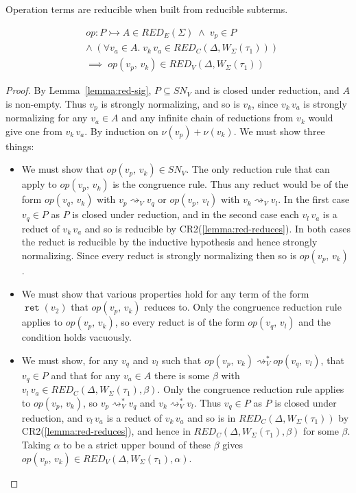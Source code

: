 \documentclass[acmsmall, screen, review, anonymous]{acmart}
\theoremstyle{definition}
\newcommand{\ind}[1]{W_{#1}}
\newcommand{\indintro}[3]{{#1}(#2,\, #3)}
\newcommand{\retname}{\mathtt{ret}}
\newcommand{\ret}[1]{\mathop{\retname}(#1)}
\newcommand{\types}{\mathrel{:}}
\newcommand{\app}[2]{#1\,#2}
\newcommand{\stepstoname}{\rightsquigarrow}
\newcommand{\stepstov}{\stepstoname_V}
\newcommand{\reducestoname}{\stepstoname^{*}}
\newcommand{\reducestov}{\reducestoname_{V}}
\newcommand{\snv}{SN_V}
\newcommand{\bound}[1]{\nu(#1)}
\newcommand{\redname}{RED}
\newcommand{\redvname}{\redname_{V}}
\newcommand{\redv}[2]{\redvname{({#1},{#2})}}
\newcommand{\redva}[3]{\redvname{({#1},{#2},{#3})}}
\newcommand{\redcname}{\redname_{C}}
\newcommand{\redc}[2]{\redcname{({#1},{#2})}}
\newcommand{\redca}[3]{\redcname{({#1},{#2},{#3})}}
\newcommand{\redsigname}{\redname_{E}}
\newcommand{\redsig}[1]{\redsigname{(#1)}}
\begin{document}
Operation terms are reducible when built from reducible subterms.
\begin{lemma}
\label{lemma:red-indintro}
\begin{align*}
  &op \types P \rightarrowtail A \in \redsig{\Sigma}
   \; \wedge \; v_p \in P \\
  &\wedge \; (\forall v_a \in A. \;
     \app{v_k}{v_a} \in \redc{\Delta}{\ind{\Sigma}(\tau_1)}) \\
  &\implies \; \indintro{op}{v_p}{v_k} \in \redv{\Delta}{\ind{\Sigma}(\tau_1)}
\end{align*}
\end{lemma}
\begin{proof}
  By Lemma~\ref{lemma:red-sig}, $P \subseteq \snv$ and is closed under
  reduction, and $A$ is non-empty. Thus $v_p$ is strongly normalizing,
  and so is $v_k$, since $\app{v_k}{v_a}$ is strongly normalizing for
  any $v_a \in A$ and any infinite chain of reductions from $v_k$ would
  give one from $\app{v_k}{v_a}$. By induction on
  $\bound{v_p} + \bound{v_k}$. We must show three things:
  \begin{itemize}
  \item We must show that $\indintro{op}{v_p}{v_k} \in \snv$. The only
    reduction rule that can apply to $\indintro{op}{v_p}{v_k}$ is the
    congruence rule. Thus any reduct would be of the form
    $\indintro{op}{v_q}{v_k}$ with $v_p \stepstov v_q$ or
    $\indintro{op}{v_p}{v_l}$ with $v_k \stepstov v_l$. In the first
    case $v_q \in P$ as $P$ is closed under reduction, and in the
    second case each $\app{v_l}{v_a}$ is a reduct of $\app{v_k}{v_a}$
    and so is reducible by CR2(\ref{lemma:red-reduces}). In both cases
    the reduct is reducible by the inductive hypothesis and hence
    strongly normalizing. Since every reduct is strongly normalizing
    then so is $\indintro{op}{v_p}{v_k}$.
  \item We must show that various properties hold for any term of the
    form $\ret{v_2}$ that $\indintro{op}{v_p}{v_k}$ reduces to. Only the
    congruence reduction rule applies to $\indintro{op}{v_p}{v_k}$, so
    every reduct is of the form $\indintro{op}{v_q}{v_l}$ and the
    condition holds vacuously.
  \item We must show, for any $v_q$ and $v_l$ such that
    $\indintro{op}{v_p}{v_k} \reducestov \indintro{op}{v_q}{v_l}$, that
    $v_q \in P$ and that for any $v_a \in A$ there is some $\beta$ with
    $\app{v_l}{v_a} \in \redca{\Delta}{\ind{\Sigma}(\tau_1)}{\beta}$.
    Only the congruence reduction rule applies to
    $\indintro{op}{v_p}{v_k}$, so $v_p \reducestov v_q$ and
    $v_k \reducestov v_l$. Thus $v_q \in P$ as $P$ is closed under
    reduction, and $\app{v_l}{v_a}$ is a reduct of $\app{v_k}{v_a}$ and
    so is in $\redc{\Delta}{\ind{\Sigma}(\tau_1)}$ by
    CR2(\ref{lemma:red-reduces}), and hence in
    $\redca{\Delta}{\ind{\Sigma}(\tau_1)}{\beta}$ for some
    $\beta$. Taking $\alpha$ to be a strict upper bound of these
    $\beta$ gives
    $\indintro{op}{v_p}{v_k} \in
    \redva{\Delta}{\ind{\Sigma}(\tau_1)}{\alpha}$.
  \end{itemize}
\end{proof}
\end{document}
